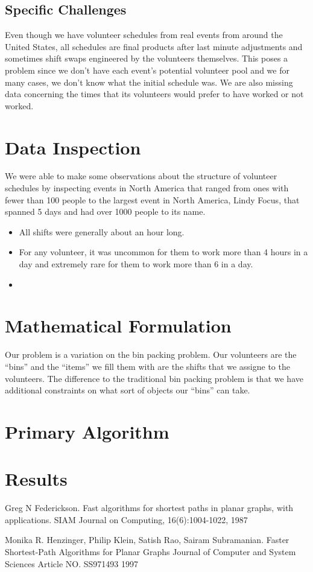 \documentclass[11pt]{article}
\theoremstyle{definition}
\begin{document}
\begin{multicols}{2}
\subsection{Specific Challenges}
Even though we have volunteer schedules from real events from around the United States, all schedules are final products after last minute adjustments and sometimes shift swaps engineered by the volunteers themselves.
This poses a problem since we don't have each event's potential volunteer pool and we for many cases, we don't know what the initial schedule was.
We are also missing data concerning the times that its volunteers would prefer to have worked or not worked.

\section{Data Inspection}
We were able to make some observations about the structure of volunteer schedules by inspecting events in North America that ranged from ones with fewer than 100 people to the largest event in North America, Lindy Focus, that spanned 5 days and had over 1000 people to its name.
\begin{itemize}\itemsep0pt
\item All shifts were generally about an hour long.
\item For any volunteer, it was uncommon for them to work more than 4 hours in a day and extremely rare for them to work more than 6 in a day.
\item 
\end{itemize}
\section{Mathematical Formulation}
Our problem is a variation on the bin packing problem.
Our volunteers are the ``bins'' and the ``items'' we fill them with are the shifts that we assigne to the volunteers.
The difference to the traditional bin packing problem is that we have additional constraints on what sort of objects our ``bins'' can take.

\section{Primary Algorithm}

\section{Results}

\end{multicols}
\begin{thebibliography}{9}
	Greg N Federickson.
	Fast algorithms for shortest paths in planar graphs, with applications.
	SIAM Journal on Computing, 16(6):1004-1022,
	1987

	Monika R. Henzinger, Philip Klein, Satish Rao, Sairam Subramanian.
	Faster Shortest-Path Algorithms for Planar Graphs
	Journal of Computer and System Sciences Article NO. SS971493
	1997

\end{thebibliography}
\end{document}
